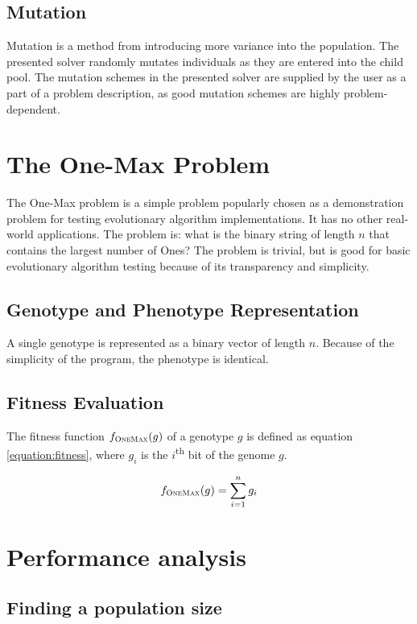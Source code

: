 \documentclass[twocolumn,oneside]{amsart}
\begin{document}
\subsection{Mutation}
Mutation is a method from introducing more variance into the population.
The presented solver randomly mutates individuals as they are entered into the child pool.
The mutation schemes in the presented solver are supplied by the user as a part of a problem description, as good mutation schemes are highly problem-dependent.

\section{The One-Max Problem}

The One-Max problem is a simple problem popularly chosen as a demonstration problem for testing evolutionary algorithm implementations.
It has no other real-world applications.
The problem is: what is the binary string of length $ n $ that contains the largest number of Ones?
The problem is trivial, but is good for basic evolutionary algorithm testing because of its transparency and simplicity.

\subsection{Genotype and Phenotype Representation}

A single genotype is represented as a binary vector of length $ n $.
Because of the simplicity of the program, the phenotype is identical.

\subsection{Fitness Evaluation}

The fitness function $ f_{\textsc{OneMax}}(g) $ of a genotype $ g $ is defined as equation \ref{equation:fitness}, where $ g_i $ is the $ i $\textsuperscript{th} bit of the genome $ g $.

\begin{equation}\label{equation:fitness}
f_{\textsc{OneMax}}(g) = \sum_{i=1}^{n} g_i
\end{equation}


\section{Performance analysis}

\subsection{Finding a population size}
\end{document}
